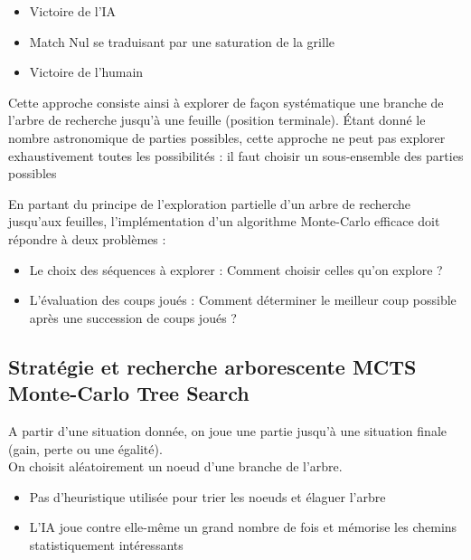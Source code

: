 \documentclass[a4paper]{article}
\begin{document}
\begin{itemize}

	\item Victoire de l'IA
	\item Match Nul se traduisant par une saturation de la grille
	\item Victoire de l'humain

\end{itemize}

Cette approche consiste ainsi à explorer de façon systématique une branche de l'arbre de recherche jusqu'à une feuille (position terminale). Étant donné le nombre astronomique de parties possibles, cette approche ne peut pas explorer exhaustivement toutes les possibilités : il faut choisir un sous-ensemble des parties possibles

En partant du principe de l'exploration partielle d'un arbre de recherche jusqu'aux feuilles, l'implémentation d'un algorithme Monte-Carlo efficace doit répondre à deux problèmes :

\begin{itemize}

\item Le choix des séquences à explorer : Comment choisir celles qu'on explore ?
\item L'évaluation des coups joués : Comment déterminer le meilleur coup possible après une succession de coups joués ? 

\end{itemize}

\subsection{Stratégie et recherche arborescente MCTS Monte-Carlo Tree Search}

A partir d’une situation donnée, on joue une partie jusqu’à une situation finale (gain, perte ou une égalité).
\\On choisit aléatoirement un noeud d'une branche de l'arbre.
\begin{itemize}

\item Pas d’heuristique utilisée pour trier les noeuds et élaguer l’arbre
\item L’IA joue contre elle-même un grand nombre de fois et mémorise les chemins statistiquement intéressants

\end{itemize}
\end{document}
